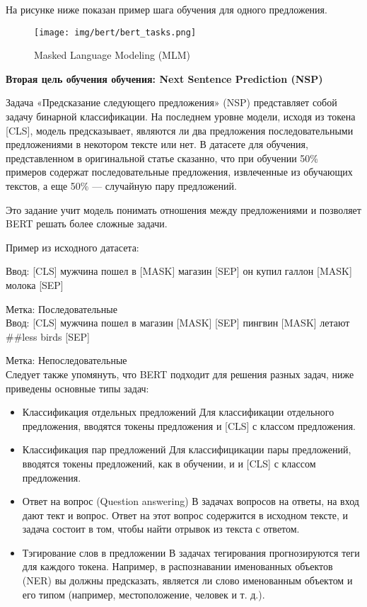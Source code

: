 \documentclass[PMI,KR]{HSEUniversity}
\begin{document}
На рисунке ниже показан пример шага обучения для одного предложения.

\begin{figure}[h]
    \centering
    \texttt{[image: img/bert/bert\_tasks.png]}
    \caption{Masked Language Modeling (MLM)}
\end{figure}
\newpage
\begin{center}
\textbf{Вторая цель обучения обучения: Next Sentence Prediction (NSP)}    
\end{center}

Задача «Предсказание следующего предложения» (NSP) представляет собой задачу бинарной классификации. На последнем уровне модели, исходя из токена [CLS], модель предсказывает, являются ли два предложения последовательными предложениями в некотором тексте или нет. В датасете для обучения, представленном в оригинальной статье сказанно, что при обучении 50\% примеров содержат последовательные предложения, извлеченные из обучающих текстов, а еще 50\% — случайную пару предложений. 

Это задание учит модель понимать отношения между предложениями и позволяет BERT решать более сложные задачи.

\begin{center}
Пример из исходного датасета:    
\end{center}

Ввод: [CLS] мужчина пошел в [MASK] магазин [SEP] он купил галлон [MASK] молока [SEP]

Метка: Последовательные \\

Ввод: [CLS] мужчина пошел в магазин [MASK] [SEP] пингвин [MASK] летают \#\#less birds [SEP]

Метка: Непоследовательные\\

Следует также упомянуть, что BERT подходит для решения разных задач, ниже приведены основные типы задач:

\begin{itemize}
    \item Классификация отдельных предложений
    Для классификации отдельного предложения, вводятся токены предложения и [CLS] с классом предложения.
    \item Классификация пар предложений
    Для классифицикации пары предложений, вводятся токены предложений, как в обучении, и и [CLS] с классом предложения.
    \item Ответ на вопрос (Question answering)
    В задачах вопросов на ответы, на вход дают тект и вопрос. Ответ на этот вопрос содержится в исходном тексте, и задача состоит в том, чтобы найти отрывок из текста с ответом.
    \item Тэгирование слов в предложении
    В задачах тегирования прогнозируются теги для каждого токена. Например, в распознавании именованных объектов (NER) вы должны предсказать, является ли слово именованным объектом и его типом (например, местоположение, человек и т. д.).
\end{itemize}
\end{document}
